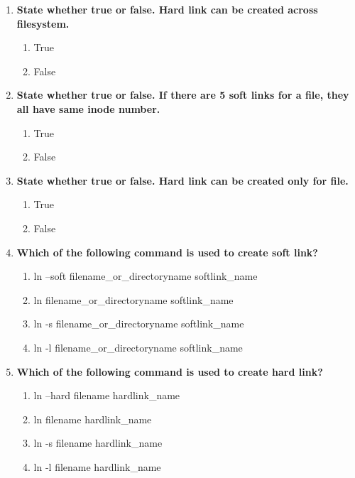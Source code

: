 \begin{flushleft}
\begin{enumerate}
		\item \textbf{State whether true or false. Hard link can be created across filesystem.}
		\begin{enumerate}[label=(\alph*)]
			\item True
			\item False   %
		\end{enumerate}
		\bigskip
		\bigskip	

		
		\item \textbf{State whether true or false. If there are 5 soft links for a file, they all have same inode number.}
		\begin{enumerate}[label=(\alph*)]
			\item True 
			\item False %
		\end{enumerate}
		\bigskip
		\bigskip	

		\item \textbf{State whether true or false. Hard link can be created only for file.}
		\begin{enumerate}[label=(\alph*)]
			\item True  %
			\item False 
		\end{enumerate}
		\bigskip
		\bigskip	
		
		\item \textbf{Which of the following command is used to create soft link?}
		\begin{enumerate}[label=(\alph*)]
			\item ln --soft filename\_or\_directoryname  softlink\_name
			\item ln filename\_or\_directoryname  softlink\_name
			\item ln -s filename\_or\_directoryname  softlink\_name %
			\item ln -l filename\_or\_directoryname  softlink\_name
		\end{enumerate}
		\bigskip
		\bigskip	
		
		\item \textbf{Which of the following command is used to create hard link?}
		\begin{enumerate}[label=(\alph*)]
			\item ln --hard filename  hardlink\_name
			\item ln filename  hardlink\_name   %
			\item ln -s filename  hardlink\_name 
			\item ln -l filename  hardlink\_name
		\end{enumerate}
		\bigskip
		\bigskip	
		
		
	\end{enumerate}
	
	
\end{flushleft}

\newpage

\afterpage{\blankpage}